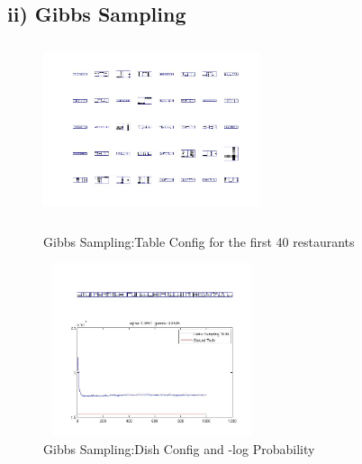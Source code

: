 \documentclass{article}
\begin{document}
\begin{spacing}{1.1}
\subsection{ii) Gibbs Sampling}
\begin{figure}[h] 
  \begin{minipage}[b]{0.5\textwidth} 
    \centering 
    \includegraphics[width=2.5in,height=2in]{Gobbs1000d.jpg} 
    \caption{Gibbs Sampling:Table Config for the first 40 restaurants}
    \label{fig:by:table} 
  \end{minipage}%
  \begin{minipage}[b]{0.5\textwidth} 
    \centering 
    \includegraphics[width=2.5in,height=2in]{g_t.jpg} 
    \caption{Gibbs Sampling:Dish Config and -log Probability}
    \label{fig:by:table}  
   \end{minipage}%
\end{figure}



\end{spacing}
\end{document}
